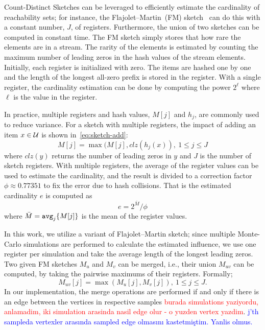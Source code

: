 \documentclass[10pt,journal,compsoc]{IEEEtran}
\newcommand\ggx[1]{\textcolor{blue}{#1}}
\newcommand\kktodo[1]{\textcolor{red}{#1}}
\begin{document}
Count-Distinct Sketches can be leveraged to efficiently estimate the cardinality of reachability sets; for instance, the Flajolet–Martin~(FM) sketch~\cite{flajolet1985probabilistic} can do this with a constant number, $J$, of registers. Furthermore, the union of two sketches can be computed in constant time. The FM sketch simply stores that how rare the elements are in a stream. The rarity of the elements is estimated by counting the maximum number of leading zeros in the hash values of the stream elements. Initially, each register is initialized with zero. The items are hashed one by one and the length of the longest all-zero prefix is stored in the register. With a single register, the cardinality estimation can be done by computing the power $2^\ell$ where $\ell$ is the value in the register.

In practice, multiple registers and hash values, $M[j]$ and $h_j$, are commonly used to reduce variance. For a sketch with multiple registers, the impact of adding an item $x \in \cal{U}$ is shown in~\eqref{eq:sketch-add}:
\begin{equation}
    \label{eq:sketch-add}
    M[j] = \max(M[j], clz(h_j(x)),~1 \leq j \leq J
\end{equation} where $clz(y)$ returns the number of leading zeros in $y$ and $J$ is the number of sketch registers. With multiple registers, the average of the register values can be used to estimate the cardinality, and the result is divided to a correction factor $\phi \approx 0.77351$ to fix the error due to hash collisions. That is the estimated cardinality $e$ is computed as
\begin{equation}
    \label{eq:sketch-estimate}
    e = 2^{\bar{M}}/\phi
\end{equation} 
where $\bar{M} = {\tt{avg}}_j\{M[j]\}$ is the mean of the register values.

In this work, we utilize a variant of Flajolet–Martin sketch; since multiple Monte-Carlo simulations are performed to calculate the estimated influence, we use one register per simulation and take the average length of the longest leading zeros. Two given FM sketches $M_u$ and $M_v$ can be merged, i.e., their union $M_{uv}$ can be computed, by taking the pairwise maximums of their registers. Formally; 
\begin{equation}
\label{eq:sketch-merge}
    M_{uv}[j] = \max(M_u[j], M_v[j]),~1 \leq j \leq J.
\end{equation} 
In our implementation, the merge operations are performed if and only if there is an edge between the vertices in respective samples \kktodo{burada simulations yaziyordu, anlamadim, iki simulation arasinda nasil edge olur - o yuzden vertex yazdim}. \ggx{ j'th sampleda vertexler arasında sampled edge olmasını kastetmiştim. Yanlis olmus.}  
\end{document}
